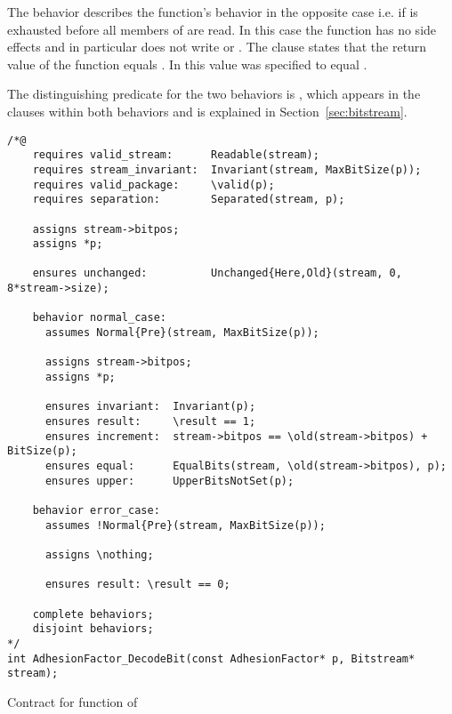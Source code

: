 The behavior  describes the function's behavior in the opposite case
i.e. if  is exhausted before all members of  are read.
In this case the function has no side effects and in particular does not write
 or .
The  clause  states that the return value
of the function equals . In  this value was specified to equal .

The distinguishing predicate for the two behaviors is ,
which appears in the  clauses within both behaviors and
is explained in Section~\ref{sec:bitstream}. 




\begin{listing}[hbt]
\begin{minipage}{0.99\textwidth}
\begin{lstlisting}[style=acsl-block]
/*@
    requires valid_stream:      Readable(stream);
    requires stream_invariant:  Invariant(stream, MaxBitSize(p));
    requires valid_package:     \valid(p);
    requires separation:        Separated(stream, p);

    assigns stream->bitpos;
    assigns *p;

    ensures unchanged:          Unchanged{Here,Old}(stream, 0, 8*stream->size);

    behavior normal_case:
      assumes Normal{Pre}(stream, MaxBitSize(p));

      assigns stream->bitpos;
      assigns *p;

      ensures invariant:  Invariant(p);
      ensures result:     \result == 1;
      ensures increment:  stream->bitpos == \old(stream->bitpos) + BitSize(p);
      ensures equal:      EqualBits(stream, \old(stream->bitpos), p);
      ensures upper:      UpperBitsNotSet(p);

    behavior error_case:
      assumes !Normal{Pre}(stream, MaxBitSize(p));

      assigns \nothing;

      ensures result: \result == 0;

    complete behaviors;
    disjoint behaviors;
*/
int AdhesionFactor_DecodeBit(const AdhesionFactor* p, Bitstream* stream);
\end{lstlisting}
\end{minipage}
\caption{\label{lst:adhesionfactor-decodebit}Contract for  function of }
\end{listing}

